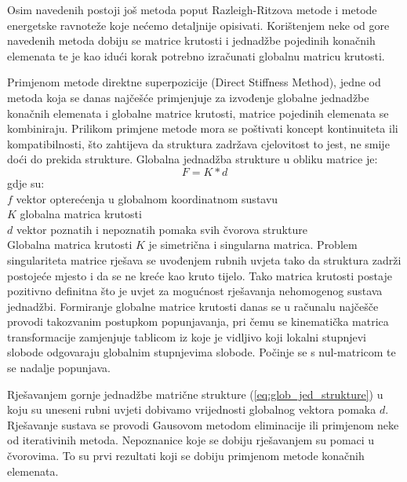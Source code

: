 \documentclass[a4paper,twoside,12pt]{memoir} %
\begin{document}
Osim navedenih postoji još metoda poput Razleigh-Ritzova metode i metode energetske ravnoteže koje nećemo detaljnije opisivati. Korištenjem neke od gore navedenih metoda dobiju se matrice krutosti i jednadžbe pojedinih konačnih elemenata te je kao idući korak potrebno izračunati globalnu matricu krutosti. \par

Primjenom metode direktne superpozicije (Direct Stiffness Method), jedne od metoda koja se danas najčešće primjenjuje za izvođenje globalne jednadžbe konačnih elemenata i globalne matrice krutosti, matrice pojedinih elemenata se kombiniraju. Prilikom primjene metode mora se poštivati koncept kontinuiteta ili kompatibilnosti, što zahtijeva da struktura zadržava cjelovitost to jest, ne smije doći do prekida strukture. Globalna jednadžba strukture u obliku matrice je:
\begin{equation}
\label{eq:glob_jed_strukture}
	F = K * d
\end{equation}
gdje su: \\
$f$ vektor opterećenja u globalnom koordinatnom sustavu \\
$K$ globalna matrica krutosti \\
$d$ vektor poznatih i nepoznatih pomaka svih čvorova strukture \\

Globalna matrica krutosti $K$ je simetrična i singularna matrica. Problem singulariteta matrice rješava se uvođenjem rubnih uvjeta tako da struktura zadrži postojeće mjesto i da se ne kreće kao kruto tijelo. Tako matrica krutosti postaje pozitivno definitna što je uvjet za mogućnost rješavanja nehomogenog sustava jednadžbi.
Formiranje globalne matrice krutosti danas se u računalu najčešče provodi takozvanim postupkom popunjavanja, pri čemu se kinematička matrica transformacije zamjenjuje tablicom iz koje je vidljivo koji lokalni stupnjevi slobode odgovaraju globalnim stupnjevima slobode. Počinje se s nul-matricom te se nadalje popunjava. \par

Rješavanjem gornje jednadžbe matrične strukture (\ref{eq:glob_jed_strukture}) u koju su uneseni rubni uvjeti dobivamo vrijednosti globalnog vektora pomaka $d$. Rješavanje sustava se provodi Gausovom metodom eliminacije ili primjenom neke od iterativinih metoda. Nepoznanice koje se dobiju rješavanjem su pomaci u čvorovima. To su prvi rezultati koji se dobiju primjenom metode konačnih elemenata. \par
\end{document}
